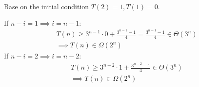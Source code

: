 \documentclass[a4paper]{article}
\begin{document}
Base on the initial condition $T(2)=1, T(1)=0$. \par 
If $n-i=1 \implies i=n-1$:
\begin{equation*}
    \begin{aligned}
        T(n) \geq 3^{n-1} \cdot 0 + \frac{3^{n-1}-1}{4}
        = \frac{3^{n-1}-1}{4} \in \Theta(3^n) \\
        \implies T(n) \in \Omega(2^n)
    \end{aligned}
\end{equation*}
If $n-i=2 \implies i=n-2$:
\begin{equation*}
    \begin{aligned}
        T(n) \geq 3^{n-2} \cdot 1 +  \frac{3^{n-2}-1}{4} \in \Theta(3^n) \\
        \implies T(n) \in \Omega(2^n)
    \end{aligned}
\end{equation*}
\end{document}
